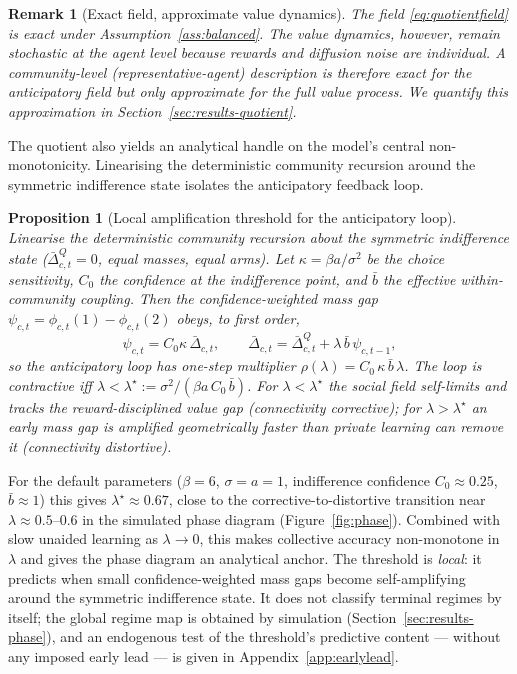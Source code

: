 \documentclass[11pt]{article}
\newtheorem{proposition}{Proposition}
\newtheorem{remark}{Remark}
\newcommand{\1}{\mathbf{1}}
\begin{document}
\begin{remark}[Exact field, approximate value dynamics]
\label{rem:exact}
The field \eqref{eq:quotientfield} is exact under
Assumption~\ref{ass:balanced}. The value dynamics, however, remain stochastic
at the agent level because rewards and diffusion noise are individual. A
community-level (representative-agent) description is therefore exact for the
anticipatory field but only approximate for the full value process. We quantify
this approximation in Section~\ref{sec:results-quotient}.
\end{remark}

The quotient also yields an analytical handle on the model's central
non-monotonicity. Linearising the deterministic community recursion around the
symmetric indifference state isolates the anticipatory feedback loop.

\begin{proposition}[Local amplification threshold for the anticipatory loop]
\label{prop:amplification}
Linearise the deterministic community recursion about the symmetric indifference
state ($\bar\Delta^Q_{c,t}=0$, equal masses, equal arms). Let
$\kappa=\beta a/\sigma^2$ be the choice sensitivity, $C_0$ the confidence at the
indifference point, and $\bar b$ the effective within-community coupling. Then
the confidence-weighted mass gap $\psi_{c,t}=\phi_{c,t}(1)-\phi_{c,t}(2)$ obeys,
to first order,
\[
\psi_{c,t}=C_0\kappa\,\bar\Delta_{c,t},\qquad
\bar\Delta_{c,t}=\bar\Delta^Q_{c,t}+\lambda\,\bar b\,\psi_{c,t-1},
\]
so the anticipatory loop has one-step multiplier
$\rho(\lambda)=C_0\,\kappa\,\bar b\,\lambda$. The loop is contractive iff
$\lambda<\lambda^\star:=\sigma^2/(\beta a\,C_0\,\bar b)$. For
$\lambda<\lambda^\star$ the social field self-limits and tracks the
reward-disciplined value gap (connectivity corrective); for
$\lambda>\lambda^\star$ an early mass gap is amplified geometrically faster than
private learning can remove it (connectivity distortive).
\end{proposition}


\noindent For the default parameters ($\beta=6$, $\sigma=a=1$, indifference
confidence $C_0\approx0.25$, $\bar b\approx1$) this gives
$\lambda^\star\approx0.67$, close to the corrective-to-distortive transition near
$\lambda\approx0.5$--$0.6$ in the simulated phase diagram
(Figure~\ref{fig:phase}). Combined with slow unaided learning as
$\lambda\to0$, this makes collective accuracy non-monotone in $\lambda$ and gives
the phase diagram an analytical anchor. The threshold is \emph{local}: it
predicts when small confidence-weighted mass gaps become self-amplifying around
the symmetric indifference state. It does not classify terminal regimes by
itself; the global regime map is obtained by simulation (Section~\ref{sec:results-phase}),
and an endogenous test of the threshold's predictive content --- without any
imposed early lead --- is given in Appendix~\ref{app:earlylead}.
\end{document}
